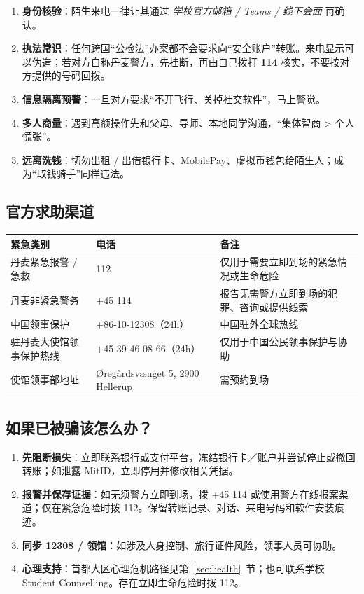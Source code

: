 \begin{enumerate}[label=\arabic*.]
  \item \textbf{身份核验}：陌生来电一律让其通过 \emph{学校官方邮箱 / Teams / 线下会面} 再确认。
  \item \textbf{执法常识}：任何跨国“公检法”办案都不会要求向“安全账户”转账。来电显示可以伪造；若对方自称丹麦警方，先挂断，再由自己拨打 \textbf{114} 核实，不要按对方提供的号码回拨。
  \item \textbf{信息隔离预警}：一旦对方要求“不开飞行、关掉社交软件”，马上警觉。
  \item \textbf{多人商量}：遇到高额操作先和父母、导师、本地同学沟通，“集体智商 > 个人慌张”。
  \item \textbf{远离洗钱}：切勿出租 / 出借银行卡、MobilePay、虚拟币钱包给陌生人；成为“取钱骑手”同样违法。
\end{enumerate}


\subsection{官方求助渠道}
\noindent
\small
{}
\begin{tabularx}{\textwidth}{p{} l X}
  \toprule
  \textbf{紧急类别} & \textbf{电话} & \textbf{备注} \\
  \midrule
  丹麦紧急报警 / 急救 & 112 & 仅用于需要立即到场的紧急情况或生命危险 \\
  丹麦非紧急警务 & +45 114 & 报告无需警方立即到场的犯罪、咨询或提供线索 \\
  中国领事保护 & +86-10-12308（24h） & 中国驻外全球热线 \\
  驻丹麦大使馆领事保护热线 & +45 39 46 08 66（24h） & 仅用于中国公民领事保护与协助 \\
  使馆领事部地址 & Øregårdsvænget 5, 2900 Hellerup & 需预约到场 \\
  \bottomrule
\end{tabularx}
\normalsize


\subsection{如果已被骗该怎么办？}

\begin{enumerate}[label=\arabic*.]
  \item \textbf{先阻断损失}：立即联系银行或支付平台，冻结银行卡／账户并尝试停止或撤回转账；如泄露 MitID，立即停用并修改相关凭据。
  \item \textbf{报警并保存证据}：如无须警方立即到场，拨 +45 114 或使用警方在线报案渠道；仅在紧急危险时拨 112。保留转账记录、对话、来电号码和软件安装痕迹。
  \item \textbf{同步 12308 / 领馆}：如涉及人身控制、旅行证件风险，领事人员可协助。
  \item \textbf{心理支持}：首都大区心理危机路径见第~\ref{sec:health}~节；也可联系学校 Student Counselling。存在立即生命危险时拨 112。
\end{enumerate}


